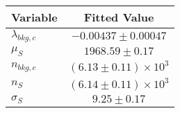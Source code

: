 \begin{tabular}[t]{lc}
\hline
Variable &Fitted Value\\
\hline\hline
$\lambda_{bkg,c}$&$-0.00437\pm0.00047$\\
\hline
$\mu_{S}$&$1968.59\pm0.17$\\
\hline
$n_{bkg,c}$&$(6.13\pm0.11)\times 10^3$\\
\hline
$n_{S}$&$(6.14\pm0.11)\times 10^3$\\
\hline
$\sigma_{S}$&$9.25\pm0.17$\\
\hline
\end{tabular}